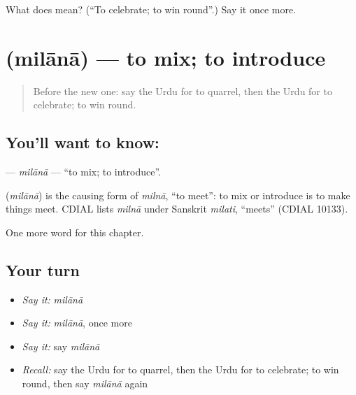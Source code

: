 \begin{tcolorbox}[breakable,colback=teal!4,colframe=teal!35!black,title={Before you move on}]
What does  mean? (\textquotedblleft{}To celebrate; to win round\textquotedblright{}.) Say it once more.
\end{tcolorbox}
\section[\texorpdfstring{\ur{ملانا} (milānā)}{ملانا (milānā)}]{ (milānā) — to mix; to introduce}

\label{lesson:UR-C180-milana}



\begin{quote}
Before the new one: say the Urdu for to quarrel, then the Urdu for to celebrate; to win round.
\end{quote}

\subsection*{You'll want to know: }
\textbf{} — \emph{milānā} — \textquotedblleft{}to mix; to introduce\textquotedblright{}.

\begin{cousinweb}
\textbf{} (\emph{milānā}) is the causing form of \emph{milnā}, \textquotedblleft{}to meet\textquotedblright{}: to mix or introduce is to make things meet. CDIAL lists \emph{milnā} under Sanskrit \emph{milati}, \textquotedblleft{}meets\textquotedblright{} (CDIAL 10133).
\end{cousinweb}

\begin{grammarlens}[title={What you've built}]
One more word for this chapter.
\end{grammarlens}

\subsection*{Your turn}
\begin{itemize}
\raggedright
  \item \emph{Say it:} \emph{milānā}
  \item \emph{Say it:} \emph{milānā}, once more
  \item \emph{Say it:} say \emph{milānā}
  \item \emph{Recall:} say the Urdu for to quarrel, then the Urdu for to celebrate; to win round, then say \emph{milānā} again
\end{itemize}

